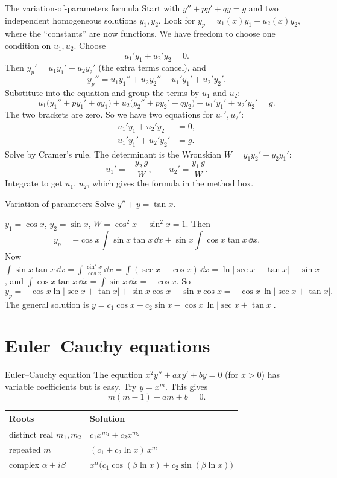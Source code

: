 \begin{derivbox}{The variation-of-parameters formula}
Start with $y'' + py' + qy = g$ and two independent homogeneous solutions $y_1, y_2$. Look for $y_p = u_1(x)y_1 + u_2(x)y_2$, where the ``constants'' are now functions. We have freedom to choose one condition on $u_1,u_2$. Choose
\[ u_1'y_1 + u_2'y_2 = 0 . \]
Then $y_p' = u_1y_1' + u_2y_2'$ (the extra terms cancel), and
\[ y_p'' = u_1y_1'' + u_2y_2'' + u_1'y_1' + u_2'y_2'. \]
Substitute into the equation and group the terms by $u_1$ and $u_2$:
\[ u_1\big(y_1'' + py_1' + qy_1\big) + u_2\big(y_2'' + py_2' + qy_2\big) + u_1'y_1' + u_2'y_2' = g. \]
The two brackets are zero. So we have two equations for $u_1', u_2'$:
\[ \begin{aligned} u_1'y_1 + u_2'y_2 &= 0,\\ u_1'y_1' + u_2'y_2' &= g. \end{aligned} \]
Solve by Cramer's rule. The determinant is the Wronskian $W = y_1y_2' - y_2y_1'$:
\[ u_1' = -\frac{y_2\,g}{W}, \qquad u_2' = \frac{y_1\,g}{W}. \]
Integrate to get $u_1$, $u_2$, which gives the formula in the method box.
\end{derivbox}

\begin{examplebox}{Variation of parameters}
Solve $y'' + y = \tan x$.

$y_1 = \cos x$, $y_2 = \sin x$, $W = \cos^2x + \sin^2x = 1$. Then
\[ y_p = -\cos x\int \sin x\tan x\,\dd x + \sin x\int \cos x\tan x\,\dd x . \]
Now $\int \sin x\tan x\,\dd x = \int\frac{\sin^2x}{\cos x}\,\dd x = \int(\sec x - \cos x)\,\dd x = \ln|\sec x + \tan x| - \sin x$, and $\int \cos x\tan x\,\dd x = \int\sin x\,\dd x = -\cos x$. So
\[ y_p = -\cos x\ln|\sec x + \tan x| + \sin x\cos x - \sin x\cos x = -\cos x\,\ln|\sec x + \tan x|. \]
The general solution is $y = c_1\cos x + c_2\sin x - \cos x\,\ln|\sec x + \tan x|$.
\end{examplebox}

\section{Euler--Cauchy equations}

\begin{methodbox}{Euler--Cauchy equation}
The equation $x^2y'' + axy' + by = 0$ (for $x>0$) has variable coefficients but is easy. Try $y = x^m$. This gives
\[ m(m-1) + am + b = 0. \]
\begin{center}
\begin{tabular}{@{}ll@{}}
\toprule
Roots & Solution \\
\midrule
distinct real $m_1, m_2$ & $c_1x^{m_1} + c_2x^{m_2}$ \\
repeated $m$ & $(c_1 + c_2\ln x)\,x^{m}$ \\
complex $\alpha\pm i\beta$ & $x^{\alpha}\big(c_1\cos(\beta\ln x) + c_2\sin(\beta\ln x)\big)$ \\
\bottomrule
\end{tabular}
\end{center}
\end{methodbox}

